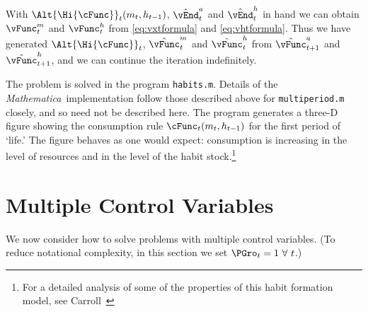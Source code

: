 \documentclass[titlepage]{\econtex}
\newcommand{\Mma}{\textit{Mathematica}}
\begin{document}
{With $\Alt{\Hi{\cFunc}}_{t}({m}_{t},h_{t-1})$, $\hat{\vEnd}_{t}^{{a}}$
and $\hat{\vEnd}_{t}^{h}$ in hand we can obtain ${\vFunc}^{m}_{t}$
and ${\vFunc}^{h}_{t}$ from \eqref{eq:vxtformula} and
\eqref{eq:vhtformula}. Thus we have generated $\Alt{\Hi{\cFunc}}_{t}$,
$\hat{\vFunc}^{m}_{t}$ and $\hat{\vFunc}^{h}_{t}$ from $\hat{\vFunc}^{a}_{t+1}$ and
$\hat{\vFunc}^{h}_{t+1}$, and we can continue the iteration indefinitely.

The problem is solved in the program \texttt{habits.m}.  Details of
the {\Mma}~implementation follow those described above for
\texttt{multiperiod.m} closely, and so need not be described here.
The program generates a three-D figure showing the consumption rule
$\cFunc_{t}({m}_{t},h_{t-1})$ for the first period of `life.'  The figure
behaves as one would expect: consumption is increasing in the level
of resources and in the level of the habit stock.\footnote{For a
detailed analysis of some of the properties of this habit formation
model, see Carroll~\citeyearpar{carroll:RiskyHabits}}


}{}

\hypertarget{Multiple-Control-Variables}{}
\section{Multiple Control Variables}

We now consider how to solve problems with multiple control variables.
(To reduce notational complexity, in this section we set $\PGro_{t}=1~\forall~t$.)
\end{document}
